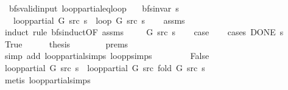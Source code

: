 \begin{isabellebody}
\isanewline
{}\isamarkupfalse%
\ {\isacharparenleft}{\kern0pt}\ bfs{\isacharunderscore}{\kern0pt}valid{\isacharunderscore}{\kern0pt}input{\isacharparenright}{\kern0pt}\ loop{\isacharunderscore}{\kern0pt}partial{\isacharunderscore}{\kern0pt}eq{\isacharunderscore}{\kern0pt}loop{\isacharcolon}{\kern0pt}\isanewline
\ \ \ {\isachardoublequoteopen}bfs{\isacharunderscore}{\kern0pt}invar{\isacharprime}{\kern0pt}{\isacharprime}{\kern0pt}\ s{\isachardoublequoteclose}\isanewline
\ \ \ {\isachardoublequoteopen}loop{\isacharunderscore}{\kern0pt}partial\ G\ src\ s\ {\isacharequal}{\kern0pt}\ loop\ G\ src\ s{\isachardoublequoteclose}\isanewline
%
\isadelimproof
\ \ %
\endisadelimproof
%
\isatagproof
{}\isamarkupfalse%
\ assms\isanewline
{}\isamarkupfalse%
\ {\isacharparenleft}{\kern0pt}induct\ rule{\isacharcolon}{\kern0pt}\ bfs{\isacharunderscore}{\kern0pt}induct{\isacharbrackleft}{\kern0pt}OF\ assms{\isacharbrackright}{\kern0pt}{\isacharparenright}{\kern0pt}\isanewline
\ \ \isamarkupfalse%
\ {\isacharparenleft}{\kern0pt}{}\ G\ src\ s{\isacharparenright}{\kern0pt}\isanewline
\ \ \isamarkupfalse%
\ {\isacharquery}{\kern0pt}case\isanewline
\ \ \isamarkupfalse%
\ {\isacharparenleft}{\kern0pt}cases\ {\isachardoublequoteopen}DONE\ s{\isachardoublequoteclose}{\isacharparenright}{\kern0pt}\isanewline
\ \ \ \ \isamarkupfalse%
\ True\isanewline
\ \ \ \ \isamarkupfalse%
\ {\isacharquery}{\kern0pt}thesis\isanewline
\ \ \ \ \ \ \isamarkupfalse%
\ {\isachardoublequoteopen}{}{\isachardot}{\kern0pt}prems{\isachardoublequoteclose}\isanewline
\ \ \ \ \ \ \isamarkupfalse%
\ {\isacharparenleft}{\kern0pt}simp\ add{\isacharcolon}{\kern0pt}\ loop{\isacharunderscore}{\kern0pt}partial{\isachardot}{\kern0pt}simps\ loop{\isacharunderscore}{\kern0pt}psimps{\isacharparenright}{\kern0pt}\isanewline
\ \ \isamarkupfalse%
\isanewline
\ \ \ \ \isamarkupfalse%
\ False\isanewline
\ \ \ \ \isamarkupfalse%
\ {\isachardoublequoteopen}loop{\isacharunderscore}{\kern0pt}partial\ G\ src\ s\ {\isacharequal}{\kern0pt}\ loop{\isacharunderscore}{\kern0pt}partial\ G\ src\ {\isacharparenleft}{\kern0pt}fold\ G\ src\ s{\isacharparenright}{\kern0pt}{\isachardoublequoteclose}\isanewline
\ \ \ \ \ \ \isamarkupfalse%
\ {\isacharparenleft}{\kern0pt}metis\ loop{\isacharunderscore}{\kern0pt}partial{\isachardot}{\kern0pt}simps{\isacharparenright}{\kern0pt}\isanewline

\end{isabellebody}
